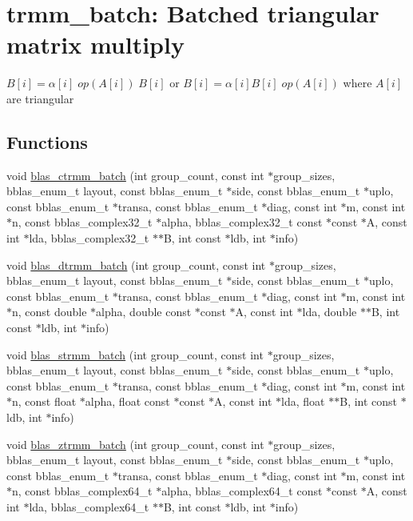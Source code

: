 \hypertarget{group__trmm__batch}{}\section{trmm\+\_\+batch\+: Batched triangular matrix multiply}
\label{group__trmm__batch}


$ B[i] = \alpha[i] \;op(A[i])\; B[i] $ or $ B[i] = \alpha[i] B[i] \;op(A[i]) $ where $ A[i] $ are triangular  


\subsection*{Functions}
\begin{DoxyCompactItemize}
\item 
void \hyperlink{group__trmm__batch_ga0f7874ec940542213e4676fdb45fad49}{blas\+\_\+ctrmm\+\_\+batch} (int group\+\_\+count, const int $\ast$group\+\_\+sizes, bblas\+\_\+enum\+\_\+t layout, const bblas\+\_\+enum\+\_\+t $\ast$side, const bblas\+\_\+enum\+\_\+t $\ast$uplo, const bblas\+\_\+enum\+\_\+t $\ast$transa, const bblas\+\_\+enum\+\_\+t $\ast$diag, const int $\ast$m, const int $\ast$n, const bblas\+\_\+complex32\+\_\+t $\ast$alpha, bblas\+\_\+complex32\+\_\+t const $\ast$const $\ast$A, const int $\ast$lda, bblas\+\_\+complex32\+\_\+t $\ast$$\ast$B, int const $\ast$ldb, int $\ast$info)
\item 
void \hyperlink{group__trmm__batch_ga8b6216cfe24af976ee344f94dacd6e9d}{blas\+\_\+dtrmm\+\_\+batch} (int group\+\_\+count, const int $\ast$group\+\_\+sizes, bblas\+\_\+enum\+\_\+t layout, const bblas\+\_\+enum\+\_\+t $\ast$side, const bblas\+\_\+enum\+\_\+t $\ast$uplo, const bblas\+\_\+enum\+\_\+t $\ast$transa, const bblas\+\_\+enum\+\_\+t $\ast$diag, const int $\ast$m, const int $\ast$n, const double $\ast$alpha, double const $\ast$const $\ast$A, const int $\ast$lda, double $\ast$$\ast$B, int const $\ast$ldb, int $\ast$info)
\item 
void \hyperlink{group__trmm__batch_ga2c83d184ed54d501cdcc35bccdee8306}{blas\+\_\+strmm\+\_\+batch} (int group\+\_\+count, const int $\ast$group\+\_\+sizes, bblas\+\_\+enum\+\_\+t layout, const bblas\+\_\+enum\+\_\+t $\ast$side, const bblas\+\_\+enum\+\_\+t $\ast$uplo, const bblas\+\_\+enum\+\_\+t $\ast$transa, const bblas\+\_\+enum\+\_\+t $\ast$diag, const int $\ast$m, const int $\ast$n, const float $\ast$alpha, float const $\ast$const $\ast$A, const int $\ast$lda, float $\ast$$\ast$B, int const $\ast$ldb, int $\ast$info)
\item 
void \hyperlink{group__trmm__batch_ga86c0ac5ca43a5fe047386a17dae5c55f}{blas\+\_\+ztrmm\+\_\+batch} (int group\+\_\+count, const int $\ast$group\+\_\+sizes, bblas\+\_\+enum\+\_\+t layout, const bblas\+\_\+enum\+\_\+t $\ast$side, const bblas\+\_\+enum\+\_\+t $\ast$uplo, const bblas\+\_\+enum\+\_\+t $\ast$transa, const bblas\+\_\+enum\+\_\+t $\ast$diag, const int $\ast$m, const int $\ast$n, const bblas\+\_\+complex64\+\_\+t $\ast$alpha, bblas\+\_\+complex64\+\_\+t const $\ast$const $\ast$A, const int $\ast$lda, bblas\+\_\+complex64\+\_\+t $\ast$$\ast$B, int const $\ast$ldb, int $\ast$info)
\end{DoxyCompactItemize}


